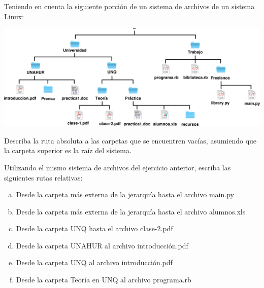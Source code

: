 \begin{exercise}
Teniendo en cuenta la siguiente porción de un sistema de archivos de un sistema
Linux:

\centerline{\includegraphics[scale=0.4]{unidades/2_informacion/2_informatica/imagenes/directorios_relativos.png}}

Describa la ruta absoluta a las carpetas que se encuentren vacías, asumiendo que
la carpeta superior es la raíz del sistema.
\end{exercise}

\begin{exercise}
Utilizando el mismo sistema de archivos del ejercicio anterior, escriba las
siguientes rutas relativas:
\begin{enumerate}[a)]
    \item Desde la carpeta más externa de la jerarquía hasta el archivo main.py
    \item Desde la carpeta más externa de la jerarquía hasta el archivo
        alumnos.xls
    \item Desde la carpeta UNQ hasta el archivo clase-2.pdf
    \item Desde la carpeta UNAHUR al archivo introducción.pdf
    \item Desde la carpeta UNQ al archivo introducción.pdf
    \item Desde la carpeta Teoría en UNQ al archivo programa.rb
\end{enumerate}
\end{exercise}


